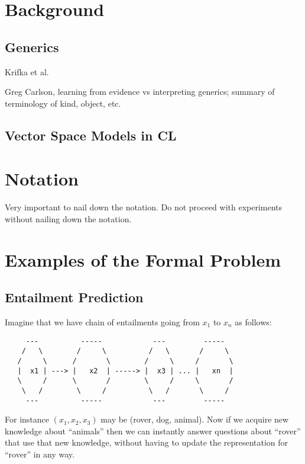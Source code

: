 \documentclass[11pt]{article}
\begin{document}
\section{Background}

\subsection{Generics}
Krifka et al. 

Greg Carlson, learning from evidence vs interpreting generics; summary of terminology of kind, object, etc.

\subsection{Vector Space Models in CL}




\section{Notation}
\label{sec:notation} {\huge Very important to nail down the
notation. Do not proceed with experiments without nailing down the
notation.}

\section{Examples of the Formal Problem}
\label{sec:exampl-form-probl}


\subsection{Entailment Prediction}
\label{subsec:entailment}
Imagine that we have chain of entailments going from $x_1$ to $x_n$ as follows:

\begin{verbatim}
     ---          -----            ---         -----
    /   \        /     \          /   \       /     \
   /     \      /       \        /     \     /       \
   |  x1 | ---> |   x2  | -----> |  x3 | ... |   xn  |
   \     /      \       /        \     /     \       /
    \   /        \     /          \   /       \     /
     ---          -----            ---         -----
\end{verbatim}

For instance $(x_1, x_2, x_3)$ may be (rover, dog, animal). Now if we
acquire new knowledge about ``animals'' then we can instantly answer
questions about ``rover'' that use that new knowledge, without having
to update the representation for ``rover'' in any way.
\end{document}
